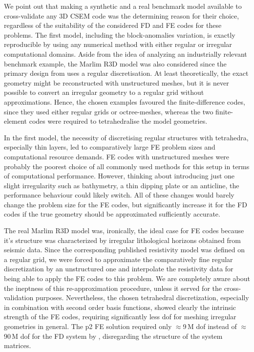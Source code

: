 \documentclass[
    paper,
  ]{geophysics}
\begin{document}
We point out that making a synthetic and a real benchmark model available to cross-validate any 3D CSEM code was the determining reason for their choice, regardless of the suitability of the considered FD and FE codes for these problems.
The first model, including the block-anomalies variation, is exactly reproducible by using any numerical method with either regular or irregular computational domains.
Aside from the idea of analyzing an industrially relevant benchmark example, the Marlim R3D model was also considered since the primary design from \cite{GEO.19.Correa} uses a regular discretisation. 
At least theoretically, the exact geometry might be reconstructed with unstructured meshes, but it is never possible to convert an irregular geometry to a regular grid without approximations.
Hence, the chosen examples favoured the finite-difference codes, since they used either regular grids or octree-meshes, whereas the two finite-element codes were required to tetrahedralise the model geometries.

In the first model, the necessity of discretising regular structures with tetrahedra, especially thin layers, led to comparatively large FE problem sizes and computational resource demands.
FE codes with unstructured meshes were probably the poorest choice of all commonly used methods for this setup in terms of computational performance.
However, thinking about introducing just one slight irregularity such as bathymetry, a thin dipping plate or an anticline, the performance behaviour could likely switch.
All of these changes would barely change the problem size for the FE codes, but significantly increase it for the FD codes if the true geometry should be approximated sufficiently accurate.

The real Marlim R3D model was, ironically, the ideal case for FE codes because it's structure was characterized by irregular lithological horizons obtained from seismic data.
Since the corresponding published resistivity model was defined on a regular grid, we were forced to approximate the comparatively fine regular discretization by an unstructured one and interpolate the resistivity data for being able to apply the FE codes to this problem.
We are completely aware about the ineptness of this re-approximation procedure, unless it served for the cross-validation purposes.
Nevertheless, the chosen tetrahedral discretization, especially in combination with second order basis functions, showed clearly the intrinsic strength of the FE codes, requiring significantly less dof for meshing irregular geometries in general. The p2 FE solution required only $\approx$9\,M dof instead of $\approx$90\,M dof for the FD system by \citet{GEO.19.Correa}, disregarding the structure of the system matrices.
\end{document}
